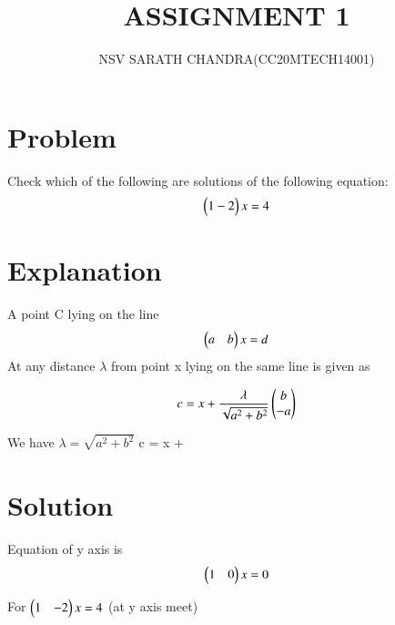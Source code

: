 \documentclass[journal,12pt,twocolumn]{IEEEtran}
\begin{document}
\title{ASSIGNMENT 1}
\author{NSV SARATH CHANDRA(CC20MTECH14001)}
\maketitle
\newpage
\bigskip
\renewcommand{\thefigure}{\theenumi}
\renewcommand{\thetable}{\theenumi}

	
\section{Problem}
Check which of the following are solutions of the following equation:
\begin{align} \begin{pmatrix}1 -2\end{pmatrix}x = 4\end{align}

\section{Explanation}\label{Explanation}

A point C lying on the line 
\begin{align}
    \begin{pmatrix}a & b\end{pmatrix}x = d
\end{align}
At any distance $\lambda$ from point x lying on the same line is given as 

\begin{align}
    c = x + \frac{\lambda}{\sqrt{a^2+b^2}}\begin{pmatrix}b \\ -a\end{pmatrix}
\end{align}

We have $\lambda = \sqrt{a^2+b^2}$ 
\implies c = x + 

\section{Solution}


Equation of y axis is 
\begin{align}
    \begin{pmatrix}1 & 0\end{pmatrix}x = 0
\end{align}

For   $\begin{pmatrix}
1 & -2 \\
\end{pmatrix}x = 4$ (at y axis meet)
\end{document}
